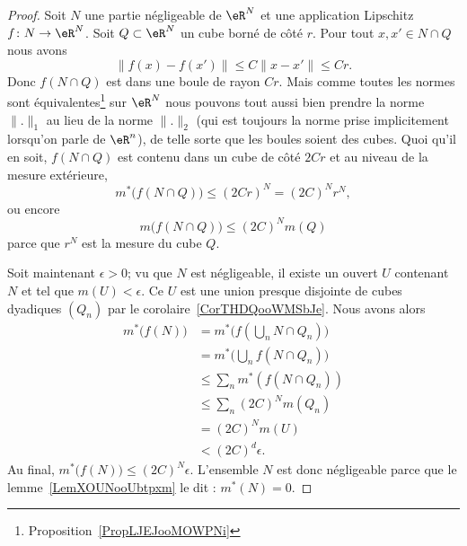 \begin{proof}
    Soit \( N\) une partie négligeable de \( \eR^N\) et une application Lipschitz \( f\colon N\to \eR^N\). Soit \( Q\subset \eR^N\) un cube borné de côté \( r\). Pour tout \( x,x'\in N\cap Q\) nous avons
    \begin{equation}
        \| f(x)-f(x') \|\leq C\| x-x' \|\leq Cr.
    \end{equation}
    Donc \( f(N\cap Q)\) est dans une boule de rayon \( Cr\). Mais comme toutes les normes sont équivalentes\footnote{Proposition~\ref{PropLJEJooMOWPNi}} sur \( \eR^N\) nous pouvons tout aussi bien prendre la norme \( \| . \|_1\) au lieu de la norme \( \| . \|_2\) (qui est toujours la norme prise implicitement lorsqu'on parle de \( \eR^n\)), de telle sorte que les boules soient des cubes. Quoi qu'il en soit, \( f(N\cap Q)\) est contenu dans un cube de côté \( 2Cr\) et au niveau de la mesure extérieure,
    \begin{equation}
        m^*\big( f(N\cap Q) \big)\leq (2Cr)^N=(2C)^Nr^N,
    \end{equation}
    ou encore
    \begin{equation}
        m\big(f(N\cap Q)\big)\leq (2C)^Nm(Q)
    \end{equation}
    parce que \( r^N\) est la mesure du cube \( Q\).

    Soit maintenant \( \epsilon>0\); vu que \( N\) est négligeable, il existe un ouvert \( U\) contenant \( N\) et tel que \( m(U)<\epsilon\). Ce \( U\) est une union presque disjointe de cubes dyadiques \( (Q_n)\) par le corolaire~\ref{CorTHDQooWMSbJe}. Nous avons alors
    \begin{subequations}
        \begin{align}
            m^*\big( f(N) \big)&=m^*\big( f(\bigcup_nN\cap Q_n) \big)\\
            &=m^*\big( \bigcup_nf(N\cap Q_n) \big)\\
            &\leq \sum_nm^*(f(N\cap Q_n))\\
            &\leq \sum_n(2C)^Nm(Q_n)\\
            &=(2C)^Nm(U)\\
            &<(2C)^d\epsilon.
        \end{align}
    \end{subequations}
    Au final, \( m^*\big( f(N) \big)\leq (2C)^N\epsilon\).  L'ensemble \( N\) est donc négligeable parce que le lemme~\ref{LemXOUNooUbtpxm} le dit : \( m^*(N)=0\).
\end{proof}

